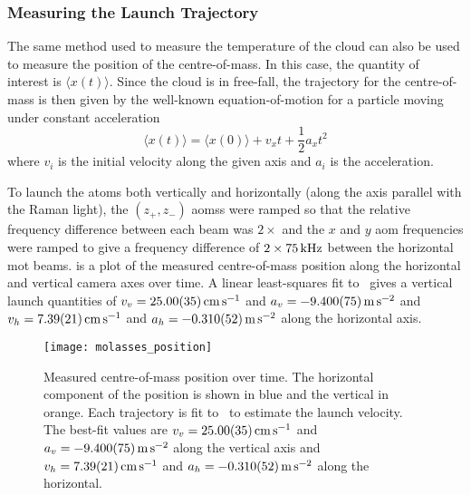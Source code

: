 \subsubsection{Measuring the Launch Trajectory}
The same method used to measure the temperature of the cloud can also be used to measure the position of the centre-of-mass. In this case, the quantity of interest is \(\langle x(t)\rangle\). Since the cloud is in free-fall, the trajectory for the centre-of-mass is then given by the well-known equation-of-motion for a particle moving under constant acceleration
\begin{equation}
    \langle x(t) \rangle = \langle x(0) \rangle + v_x t + \frac{1}{2} a_x t^2
    \label{eq:position_free}
\end{equation}
where \(v_i\) is the initial velocity along the given axis and \(a_i\) is the acceleration.
\par\noindent
To launch the atoms both vertically and horizontally (along the axis parallel with the Raman light), the \((z_+, z_-)\) \acp{aoms} were ramped so that the relative frequency difference between each beam was \(2\times\) and the \(x\) and \(y\) \ac{aom} frequencies were ramped to give a frequency difference of \(2\times \sivalue{75}{\kilo\hertz}\) between the horizontal \ac{mot} beams.  is a plot of the measured centre-of-mass position along the horizontal and vertical camera axes over time. A linear least-squares fit to~ gives a vertical launch quantities of \(v_v = \sivalue{25.0\pm0.35}{\centi\meter\per\second}\) and \(a_v = \sivalue{-9.40\pm0.075}{\metre\per\second\squared}\) and \(v_h = \sivalue{7.39\pm0.21}{\centi\meter\per\second}\) and \(a_h = \sivalue{-0.31\pm0.052}{\metre\per\second\squared}\) along the horizontal axis. 
\begin{figure}[!htbp]
    \centering
    \texttt{[image: molasses\_position]}
    \caption[Atom cloud centre-of-mass over time]{Measured centre-of-mass position over time. The horizontal component of the position is shown in blue and the vertical in orange. Each trajectory is fit to~ to estimate the launch velocity. The best-fit values are \(v_v = \sivalue{25.0\pm0.35}{\centi\meter\per\second}\) and \(a_v = \sivalue{-9.40\pm0.075}{\metre\per\second\squared}\) along the vertical axis and \(v_h = \sivalue{7.39\pm0.21}{\centi\meter\per\second}\) and \(a_h = \sivalue{-0.31\pm0.052}{\metre\per\second\squared}\) along the horizontal.}
    \label{fig:molasses_position}
\end{figure}

